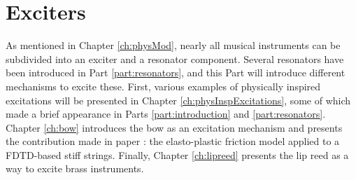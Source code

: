 \chapter*{Exciters}
As mentioned in Chapter \ref{ch:physMod}, nearly all musical instruments can be subdivided into an exciter and a resonator component. Several resonators have been introduced in Part \ref{part:resonators}, and this Part will introduce different mechanisms to excite these. First, various examples of physically inspired excitations will be presented in Chapter \ref{ch:physInspExcitations}, some of which made a brief appearance in Parts \ref{part:introduction} and \ref{part:resonators}. Chapter \ref{ch:bow} introduces the bow as an excitation mechanism and presents the contribution made in paper \citeP[C]: the elasto-plastic friction model applied to a FDTD-based stiff strings. Finally, Chapter \ref{ch:lipreed} presents the lip reed as a way to excite brass instruments. 
